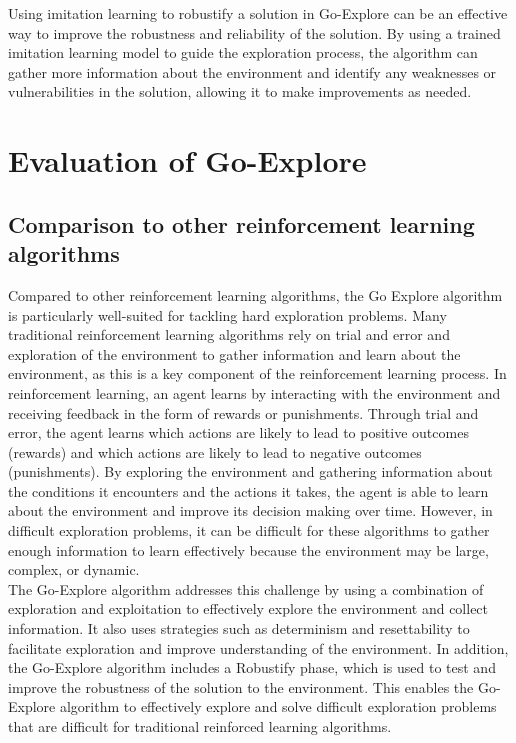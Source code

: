 \documentclass[runningheads]{llncs}%
\begin{document}
Using imitation learning to robustify a solution in Go-Explore can be an effective way to improve the robustness and reliability of the solution. By using a trained imitation learning model to guide the exploration process, the algorithm can gather more information about the environment and identify any weaknesses or vulnerabilities in the solution, allowing it to make improvements as needed.

\section{Evaluation of Go-Explore}

\subsection{Comparison to other reinforcement learning algorithms}
Compared to other reinforcement learning algorithms, the Go Explore algorithm is particularly well-suited for tackling hard exploration problems. Many traditional reinforcement learning algorithms rely on trial and error and exploration of the environment to gather information and learn about the environment, as this is a key component of the reinforcement learning process. In reinforcement learning, an agent learns by interacting with the environment and receiving feedback in the form of rewards or punishments. Through trial and error, the agent learns which actions are likely to lead to positive outcomes (rewards) and which actions are likely to lead to negative outcomes (punishments). By exploring the environment and gathering information about the conditions it encounters and the actions it takes, the agent is able to learn about the environment and improve its decision making over time. However, in difficult exploration problems, it can be difficult for these algorithms to gather enough information to learn effectively because the environment may be large, complex, or dynamic.\\

The Go-Explore algorithm addresses this challenge by using a combination of exploration and exploitation to effectively explore the environment and collect information. It also uses strategies such as determinism and resettability to facilitate exploration and improve understanding of the environment. In addition, the Go-Explore algorithm includes a Robustify phase, which is used to test and improve the robustness of the solution to the environment. This enables the Go-Explore algorithm to effectively explore and solve difficult exploration problems that are difficult for traditional reinforced learning algorithms.
\end{document}
